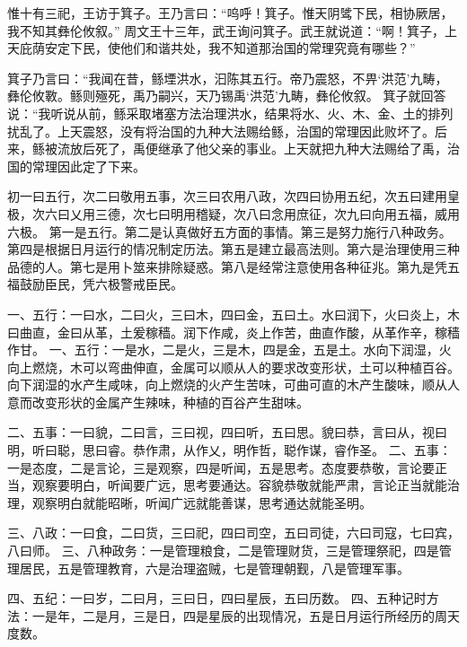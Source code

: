 \documentclass[a4paper,12pt,UTF8,twoside]{ctexbook}
\begin{document}
惟十有三祀，王访于箕子。王乃言曰：“呜呼！箕子。惟天阴骘下民，相协厥居，我不知其彝伦攸叙。”
周文王十三年，武王询问箕子。武王就说道：“啊！箕子，上天庇荫安定下民，使他们和谐共处，我不知道那治国的常理究竟有哪些？”

箕子乃言曰：“我闻在昔，鲧堙洪水，汩陈其五行。帝乃震怒，不畀‘洪范’九畴，彝伦攸斁。鲧则殛死，禹乃嗣兴，天乃锡禹‘洪范’九畴，彝伦攸叙。
箕子就回答说：“我听说从前，鲧采取堵塞方法治理洪水，结果将水、火、木、金、土的排列扰乱了。上天震怒，没有将治国的九种大法赐给鲧，治国的常理因此败坏了。后来，鲧被流放后死了，禹便继承了他父亲的事业。上天就把九种大法赐给了禹，治国的常理因此定了下来。

初一曰五行，次二曰敬用五事，次三曰农用八政，次四曰协用五纪，次五曰建用皇极，次六曰乂用三德，次七曰明用稽疑，次八曰念用庶征，次九曰向用五福，威用六极。
第一是五行。第二是认真做好五方面的事情。第三是努力施行八种政务。第四是根据日月运行的情况制定历法。第五是建立最高法则。第六是治理使用三种品德的人。第七是用卜筮来排除疑惑。第八是经常注意使用各种征兆。第九是凭五福鼓励臣民，凭六极警戒臣民。

一、五行：一曰水，二曰火，三曰木，四曰金，五曰土。水曰润下，火曰炎上，木曰曲直，金曰从革，土爰稼穑。润下作咸，炎上作苦，曲直作酸，从革作辛，稼穑作甘。
一、五行：一是水，二是火，三是木，四是金，五是土。水向下润湿，火向上燃烧，木可以弯曲伸直，金属可以顺从人的要求改变形状，土可以种植百谷。向下润湿的水产生咸味，向上燃烧的火产生苦味，可曲可直的木产生酸味，顺从人意而改变形状的金属产生辣味，种植的百谷产生甜味。

二、五事：一曰貌，二曰言，三曰视，四曰听，五曰思。貌曰恭，言曰从，视曰明，听曰聪，思曰睿。恭作肃，从作乂，明作哲，聪作谋，睿作圣。
二、五事：一是态度，二是言论，三是观察，四是听闻，五是思考。态度要恭敬，言论要正当，观察要明白，听闻要广远，思考要通达。容貌恭敬就能严肃，言论正当就能治理，观察明白就能昭晰，听闻广远就能善谋，思考通达就能圣明。

三、八政：一曰食，二曰货，三曰祀，四曰司空，五曰司徒，六曰司寇，七曰宾，八曰师。
三、八种政务：一是管理粮食，二是管理财货，三是管理祭祀，四是管理居民，五是管理教育，六是治理盗贼，七是管理朝觐，八是管理军事。

四、五纪：一曰岁，二曰月，三曰日，四曰星辰，五曰历数。
四、五种记时方法：一是年，二是月，三是日，四是星辰的出现情况，五是日月运行所经历的周天度数。
\end{document}
